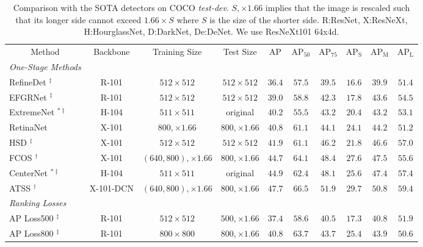 \documentclass{article}
\newcommand{\cellcenter}[1]{\multicolumn{1}{|c|}{#1}}
\begin{document}
\begin{table}[t]
    \centering
    \footnotesize 
\caption{Comparison with the SOTA detectors on COCO \textit{test-dev}. $S, \times 1.66$ implies that the image is rescaled such that its longer side cannot exceed $1.66 \times S$ where $S$ is the size of the shorter side.  R:ResNet, X:ResNeXt, H:HourglassNet, D:DarkNet, De:DeNet. We use ResNeXt101 64x4d.}
    \label{tab:testdev}
    \setlength{\tabcolsep}{0.25em}
    \begin{tabular}{|l|c|c|c|c|c|c|c|c|c|} \hline
        \cellcenter{Method}&Backbone&Training Size&Test Size&$\mathrm{AP}$&$\mathrm{AP_{50}}$&$\mathrm{AP_{75}}$&$\mathrm{AP_{S}}$ &$\mathrm{AP_{M}}$&$\mathrm{AP_{L}}$ \\ 
        \hhline{==========}
        \textit{One-Stage Methods}& & & & & & & & &\\
RefineDet \cite{AnchorRefine}$^{\ddagger}$&R-101&$512\times512$&$512\times512$&$36.4$&$57.5$&$39.5$&$16.6$&$39.9$&$51.4$\\
        EFGRNet \cite{EnrichedFeatureGuided}$^{\ddagger}$&R-101&$512\times512$&$512\times512$&$39.0$&$58.8$&$42.3$&$17.8$&$43.6$&$54.5$\\ 
ExtremeNet \cite{ExtremeNet}$^{* \ddagger}$&H-104&$511\times511$&original&$40.2$&$55.5$&$43.2$&$20.4$&$43.2$&$53.1$\\
RetinaNet \cite{FocalLoss}&X-101&$800, \times 1.66$&$800, \times 1.66$&$40.8$&$61.1$&$44.1$&$24.1$&$44.2$&$51.2$\\
HSD \cite{HierarchicalShotDet} $^{\ddagger}$&X-101&$512\times512$&$512\times512$&$41.9$&$61.1$&$46.2$&$21.8$&$46.6$&$57.0$\\ 
FCOS \cite{FCOS}$^\dagger$&X-101&$(640, 800), \times 1.66$&$800, \times 1.66$&$44.7$&$64.1$&$48.4$&$27.6$&$47.5$&$55.6$\\         
        CenterNet \cite{CenterNet}$^{* \ddagger}$&H-104&$511\times511$&original&$44.9$&$62.4$&$48.1$&$25.6$&$47.4$&$57.4$\\          
        ATSS \cite{ATSS}$^\dagger$&X-101-DCN&$(640, 800), \times 1.66$&$800, \times 1.66$&$47.7$&$66.5$&$51.9$&$29.7$&$50.8$&$59.4$\\        
        \hhline{==========}
        \textit{Ranking Losses}& & & & & & & & &\\  
AP Loss500 \cite{APLoss}$^\ddagger$&R-101&$512 \times 512$&$500, \times 1.66$&$37.4$&$58.6$&$40.5$&$17.3$&$40.8$&$51.9$\\
        AP Loss800 \cite{APLoss}$^\ddagger$&R-101&$800 \times 800$&$800, \times 1.66$&$40.8$&$63.7$&$43.7$&$25.4$&$43.9$&$50.6$\\

\end{tabular}
\end{table}
\end{document}

